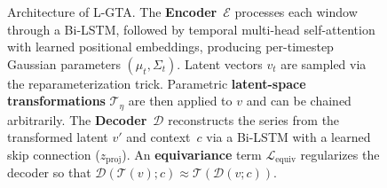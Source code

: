 \begin{figure}[t]
{
}%

\caption{
Architecture of L-GTA. The \textbf{Encoder}~$\mathcal{E}$ processes each window through a Bi-LSTM, followed by temporal multi-head self-attention with learned positional embeddings, producing per-timestep Gaussian parameters $(\mu_t, \Sigma_t)$. Latent vectors $v_t$ are sampled via the reparameterization trick. Parametric \textbf{latent-space transformations} $\mathcal{T}_\eta$ are then applied to $v$ and can be chained arbitrarily. The \textbf{Decoder}~$\mathcal{D}$ reconstructs the series from the transformed latent $v'$ and context~$c$ via a Bi-LSTM with a learned skip connection ($z_{\mathrm{proj}}$).
An \textbf{equivariance} term $\mathcal{L}_{\mathrm{equiv}}$ regularizes the decoder so that $\mathcal{D}(\mathcal{T}(v); c) \approx \mathcal{T}(\mathcal{D}(v; c))$.
}
\label{fig:lgta_architecture}
\end{figure}
